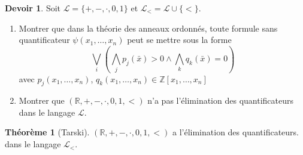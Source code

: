 \documentclass[12pt,a4paper]{exprog}
\theoremstyle{definition} \newtheorem{thm}{Th\'{e}or\`{e}me}
\theoremstyle{definition} \newtheorem{quest}{Question}
\theoremstyle{definition} \newtheorem{dev}[quest]{Devoir}
\begin{document}
\begin{dev}
  Soit $\mathcal{L}= \{+, -, \cdot, 0, 1\}$ et
  $\mathcal{L}_{<} = \mathcal{L}\cup \{<\}$.
  \begin{enumerate}
  \item Montrer que dans la théorie des anneaux ordonnés, toute
    formule sans quantificateur $\psi(x_1, \ldots, x_n)$ peut
    se mettre sous la forme
    \begin{equation}
      \bigvee\limits_i \left (\bigwedge\limits_j p_j(\bar{x}) > 0 \land \bigwedge\limits_k q_k(\bar{x})=0\right)
    \end{equation}
    avec $p_j(x_1, \ldots, x_n)$,
    $q_k(x_1, \ldots, x_n)\in\mathbb Z[x_1, \ldots, x_n]$
  \item Montrer que $(\mathbb R, +, -, \cdot, 0, 1, <)$ n'a pas
    l'élimination des quantificateurs dans le langage $\mathcal L$.
  \end{enumerate}

\end{dev}

\begin{thm}[Tarski]
  $(\mathbb R, +, -, \cdot, 0, 1, <)$ a l'élimination des quantificateurs. dans le langage $\mathcal L_{<}$.
\end{thm}
\end{document}

